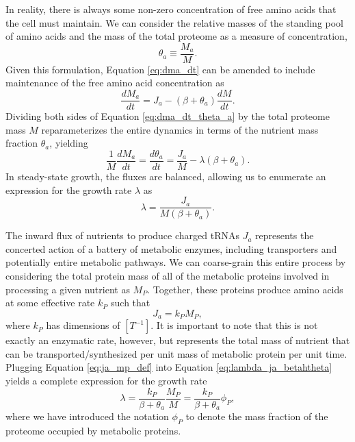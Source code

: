 \documentclass[letterpaper, 11pt]{article}
\begin{document}
In reality, there is always some non-zero concentration of free amino acids that
the cell must maintain. We can consider the relative
masses of the standing pool of amino acids and the mass of the total proteome as
a measure of concentration, 
\begin{equation}
    \theta_a \equiv \frac{M_a}{M}.
    \label{eq:theta_a_def}
\end{equation}
Given this formulation, Equation \eqref{eq:dma_dt} can be amended to include
maintenance of the free amino acid concentration as 
\begin{equation}
\frac{dM_a}{dt} = J_a - (\beta + \theta_a)\frac{dM}{dt}. 
\label{eq:dma_dt_theta_a}
\end{equation}
Dividing both sides of Equation \ref{eq:dma_dt_theta_a} by the total proteome
mass $M$ reparameterizes the entire dynamics in terms of the nutrient mass fraction $\theta_a$, yielding 
\begin{equation}
\frac{1}{M}\frac{dM_a}{dt} = \frac{d\theta_a}{dt} = \frac{J_a}{M} - \lambda (\beta + \theta_a).
\label{eq:dtheta_a_dt}
\end{equation}
In steady-state growth, the fluxes are balanced, allowing us to enumerate an 
expression for the growth rate $\lambda$ as 
\begin{equation}
\lambda = \frac{J_a}{M\left(\beta + \theta_a\right)}.
\label{eq:lambda_ja_betatheta}
\end{equation}

The inward flux of nutrients to produce charged tRNAs $J_a$ represents the 
concerted action of a battery of metabolic enzymes, including transporters and
potentially entire metabolic pathways. We can coarse-grain this entire process 
by considering the total protein mass of all of the metabolic proteins involved 
in processing a given nutrient as $M_P$. Together, these proteins produce amino
acids at some effective rate $k_P$ such that 
\begin{equation}
    J_a = k_P M_P, 
    \label{eq:ja_mp_def}
\end{equation}
where $k_P$ has dimensions of $[T^{-1}]$. It is important to note that this is 
not exactly an enzymatic rate, however, but represents the total mass of
nutrient that can be transported/synthesized per unit mass of metabolic protein
per unit time. Plugging Equation \eqref{eq:ja_mp_def} into Equation
\eqref{eq:lambda_ja_betahtheta} yields a complete expression for the growth rate
\begin{equation}
\lambda = \frac{k_P}{\beta + \theta_a} \frac{M_P}{M} = \frac{k_P}{\beta + \theta_a} \phi_P,
\label{eq:lambda_phip}
\end{equation}
where we have introduced the notation $\phi_P$ to denote the mass fraction of
the proteome occupied by metabolic proteins.
\end{document}
